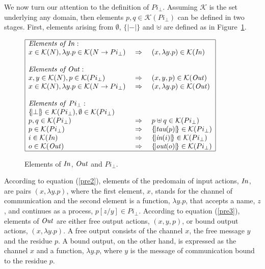 \documentclass[10pt,a4paper,final,oneside,fleqn]{book}
\begin{document}
We now turn our attention to the definition of $Pi_\bot$. Assuming $\mathcal{K}$ is the set underlying any domain, then elements $p,q\in\mathcal{K}(Pi_\bot)$ can be defined in two stages.  First, elements arising from $\emptyset$, $\{\!|-|\!\}$ and $\uplus$ are defined as in \mbox{Figure \ref{simplepi}}.
\begin{figure}[bht]
\begin{center}
$\begin{array}{|lll|}\hline
\mbox{{\itshape Elements of In\/}}:&&\\
x\in\mathcal{K}(N),\lambda y.p\in\mathcal{K}(N\to Pi_\bot)&~\Rightarrow~&(x,\lambda y.p)\in\mathcal{K}(\mbox{{\itshape In\/}})\\&&\\
\mbox{{\itshape Elements of Out\/}}:&&\\
x,y\in\mathcal{K}(N),p\in\mathcal{K}(Pi_\bot)&~\Rightarrow~&(x,y,p)\in\mathcal{K}(\mbox{{\itshape Out\/}})\\
x\in \mathcal{K}(N), \lambda y.p\in\mathcal{K}(N\to Pi_\bot)&~\Rightarrow~&(x,\lambda y.p)\in\mathcal{K}(\mbox{{\itshape Out\/}})\\&&\\
\mbox{{\itshape Elements of\/} }Pi_\bot:&&\\
\{\!|\bot|\!\}\in\mathcal{K}(Pi_\bot),\emptyset\in\mathcal{K}(Pi_\bot)&&\\
p,q\in\mathcal{K}(Pi_\bot)&~\Rightarrow~&p\uplus q\in\mathcal{K}(Pi_\bot)\\
p\in\mathcal{K}(Pi_\bot)&~\Rightarrow~&\{\!|\mbox{{\itshape tau}}(p)|\!\}\in\mathcal{K}(Pi_\bot)\\
i\in\mathcal{K}(\mbox{{\itshape In\/}})&~\Rightarrow~&\{\!|\mbox{{\itshape in}}(i)|\!\}\in\mathcal{K}(Pi_\bot)\\
o\in\mathcal{K}(\mbox{{\itshape Out\/}})&~\Rightarrow~&\{\!|\mbox{{\itshape out}}(o)|\!\}\in\mathcal{K}(Pi_\bot)\\
\hline
\end{array}$
\end{center}
\caption{Elements of $\mbox{{\itshape In\/}}$, $\mbox{{\itshape Out\/}}$ and $Pi_\bot$.\label{simplepi}}
\end{figure}

According to equation (\ref{pre2}), elements of the predomain of input actions, $\mbox{{\itshape In\/}}$, are pairs $(x,\lambda y.p)$, where the first element, $x$, stands for the channel of communication and the second element is a function, $\lambda y.p$, that accepts a name, $z$, and continues as a process, $p[z/y]\in Pi_\bot$. According to equation (\ref{pre3}), elements of $\mbox{{\itshape Out\/}}$ are either free output actions, $(x,y,p)$, or bound output actions, $(x,\lambda y.p)$.  A free output consists of the channel $x$, the free message $y$ and the residue $p$.  A bound output, on the other hand, is expressed as the channel $x$ and a function, $\lambda y.p$, where $y$ is the message of communication bound to the residue $p$.
\end{document}
